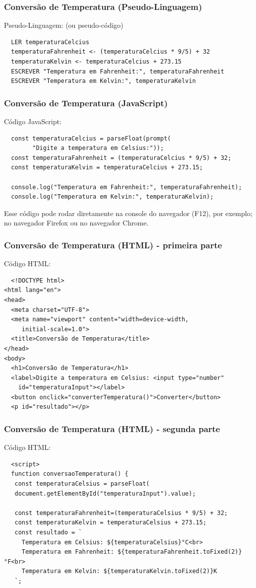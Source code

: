 \documentclass[13pt, xcolor={dvipsnames,svgnames}, portuguese]{beamer}
\begin{document}
\begin{frame}[fragile]
  \frametitle{Conversão de Temperatura (Pseudo-Linguagem)}
  Pseudo-Linguagem: (ou pseudo-código)
  \begin{verbatim}
  LER temperaturaCelcius
  temperaturaFahrenheit <- (temperaturaCelcius * 9/5) + 32
  temperaturaKelvin <- temperaturaCelcius + 273.15
  ESCREVER "Temperatura em Fahrenheit:", temperaturaFahrenheit
  ESCREVER "Temperatura em Kelvin:", temperaturaKelvin
  \end{verbatim}
\end{frame}


\begin{frame}[fragile]
  \frametitle{Conversão de Temperatura (JavaScript)}
  Código JavaScript:
  \begin{verbatim}
  const temperaturaCelcius = parseFloat(prompt(
        "Digite a temperatura em Celsius:"));
  const temperaturaFahrenheit = (temperaturaCelcius * 9/5) + 32;
  const temperaturaKelvin = temperaturaCelcius + 273.15;

  console.log("Temperatura em Fahrenheit:", temperaturaFahrenheit);
  console.log("Temperatura em Kelvin:", temperaturaKelvin);
  \end{verbatim}
  Esse código pode rodar diretamente na console do navegador (F12), por exemplo; no navegador Firefox ou no navegador Chrome.
\end{frame}



\begin{frame}[fragile]
  \frametitle{Conversão de Temperatura (HTML) - primeira parte}
  Código HTML:
  \begin{verbatim}
  <!DOCTYPE html>
<html lang="en">
<head>
  <meta charset="UTF-8">
  <meta name="viewport" content="width=device-width, 
     initial-scale=1.0">
  <title>Conversão de Temperatura</title>
</head>
<body>
  <h1>Conversão de Temperatura</h1>
  <label>Digite a temperatura em Celsius: <input type="number" 
    id="temperaturaInput"></label>
  <button onclick="converterTemperatura()">Converter</button>
  <p id="resultado"></p>
  \end{verbatim}
\end{frame}


\begin{frame}[fragile]
  \frametitle{Conversão de Temperatura (HTML) - segunda parte}
  Código HTML:
  \begin{verbatim}
  <script>
  function conversaoTemperatura() {
   const temperaturaCelsius = parseFloat(
   document.getElementById("temperaturaInput").value);
      
   const temperaturaFahrenheit=(temperaturaCelsius * 9/5) + 32;
   const temperaturaKelvin = temperaturaCelsius + 273.15;
   const resultado = `
     Temperatura em Celsius: ${temperaturaCelsius}°C<br>
     Temperatura em Fahrenheit: ${temperaturaFahrenheit.toFixed(2)}°F<br>
     Temperatura em Kelvin: ${temperaturaKelvin.toFixed(2)}K
   `;
  \end{verbatim}
\end{frame}
\end{document}
